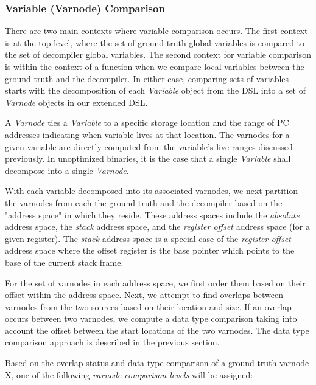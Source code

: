\documentclass[a4paper,twoside]{article}
\begin{document}
\subsubsection{Variable (Varnode) Comparison}

There are two main contexts where variable comparison occurs. The first context is at the top level, where the set of ground-truth global variables is compared to the set of decompiler global variables. The second context for variable comparison is within the context of a function when we compare local variables between the ground-truth and the decompiler. In either case, comparing sets of variables starts with the decomposition of each \emph{Variable} object from the DSL into a set of \emph{Varnode} objects in our extended DSL.

A \emph{Varnode} ties a \emph{Variable} to a specific storage location and the range of PC addresses indicating when variable lives at that location. The varnodes for a given variable are directly computed from the variable's live ranges discussed previously. In unoptimized binaries, it is the case that a single \emph{Variable} shall decompose into a single \emph{Varnode}.

With each variable decomposed into its associated varnodes, we next partition the varnodes from each the ground-truth and the decompiler based on the "address space" in which they reside. These address spaces include the \emph{absolute} address space, the \emph{stack} address space, and the \emph{register offset} address space (for a given register). The \emph{stack} address space is a special case of the \emph{register offset} address space where the offset register is the base pointer which points to the base of the current stack frame.

For the set of varnodes in each address space, we first order them based on their offset within the address space. Next, we attempt to find overlaps between varnodes from the two sources based on their location and size. If an overlap occurs between two varnodes, we compute a data type comparison taking into account the offset between the start locations of the two varnodes. The data type comparison approach is described in the previous section.

Based on the overlap status and data type comparison of a ground-truth varnode X, one of the following \emph{varnode comparison levels} will be assigned:
\end{document}
